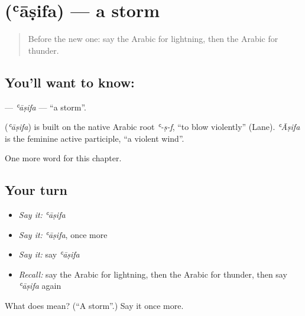 \section[\texorpdfstring{\ar{عاصفة} (ʿāṣifa)}{عاصفة (ʿāṣifa)}]{ (ʿāṣifa) — a storm}

\label{lesson:AR-C133-asifa}



\begin{quote}
Before the new one: say the Arabic for lightning, then the Arabic for thunder.
\end{quote}

\subsection*{You'll want to know: }
\textbf{} — \emph{ʿāṣifa} — \textquotedblleft{}a storm\textquotedblright{}.

\begin{cousinweb}
\textbf{} (\emph{ʿāṣifa}) is built on the native Arabic root \emph{ʿ-ṣ-f}, \textquotedblleft{}to blow violently\textquotedblright{} (Lane). \emph{ʿĀṣifa} is the feminine active participle, \textquotedblleft{}a violent wind\textquotedblright{}.
\end{cousinweb}

\begin{grammarlens}[title={What you've built}]
One more word for this chapter.
\end{grammarlens}

\subsection*{Your turn}
\begin{itemize}
\raggedright
  \item \emph{Say it:} \emph{ʿāṣifa}
  \item \emph{Say it:} \emph{ʿāṣifa}, once more
  \item \emph{Say it:} say \emph{ʿāṣifa}
  \item \emph{Recall:} say the Arabic for lightning, then the Arabic for thunder, then say \emph{ʿāṣifa} again
\end{itemize}

\begin{tcolorbox}[breakable,colback=teal!4,colframe=teal!35!black,title={Before you move on}]
What does  mean? (\textquotedblleft{}A storm\textquotedblright{}.) Say it once more.
\end{tcolorbox}
